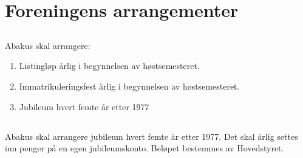 \section{Foreningens arrangementer}

\subsection{}
Abakus skal arrangere:

\begin{enumerate}[label=\alph*)]
  \item Listingløp årlig i begynnelsen av høstsemesteret.
  \item Immatrikuleringsfest årlig i begynnelsen av høstsemesteret.
  \item Jubileum hvert femte år etter 1977
\end{enumerate}

\subsection{}
Abakus skal arrangere jubileum hvert femte år etter 1977. Det skal årlig settes inn penger
på en egen jubileumskonto. Beløpet bestemmes av Hovedstyret.
